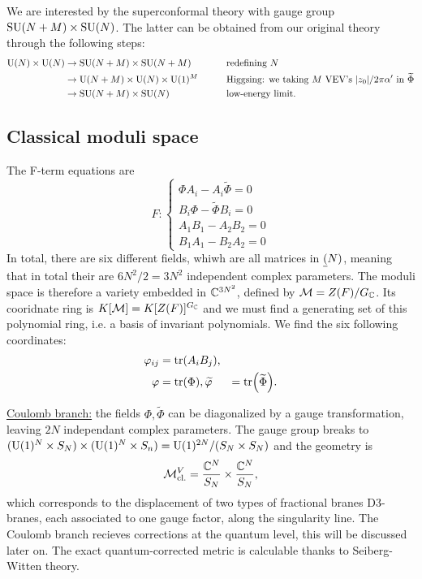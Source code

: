         We are interested by the superconformal theory with gauge group $\text{SU}(N+M)\times\text{SU}(N)$. The latter can be obtained from our original theory through the following steps:
        \begin{alignat}{2}
            \text{U}(N)\times\text{U}(N)&\to \text{SU}(N+M)\times\text{SU}(N+M)\qquad&&\text{redefining $N$}\\
            &\to \text{U}(N+M)\times\text{U}(N)\times\text{U}(1)^M\qquad&&\text{Higgsing: we taking $M$ VEV's $\abs{z_0}/2\pi\alpha'$ in $\widetilde{\Phi}$}\\
            &\to \text{SU}(N+M)\times\text{SU}(N)\qquad&&\text{low-energy limit}.\label{eq:theorymanip}
        \end{alignat}


    \subsection{Classical moduli space}

        The F-term equations are
        \begin{equation}
            F:
            \begin{cases}
                \Phi A_i-A_i\tilde{\Phi} = 0\\
                B_i\Phi-\tilde{\Phi}B_i = 0\\
                A_1B_1-A_2B_2 = 0\\
                B_1A_1-B_2A_2 = 0
            \end{cases}
        \end{equation}
        In total, there are six different fields, whiwh are all matrices in $\underline{(}N)$, meaning that in total their are $6N^2/2=3N^2$ independent complex parameters. The moduli space is therefore a variety embedded in $\mathbb{C}^{3N^2}$, defined by $\mathcal{M}=Z(F)/G_{\mathbb{C}}$. Its cooridnate ring is $K[\mathcal{M}]=K[Z(F)]^{G_{\mathbb{C}}}$ and we must find a generating set of this polynomial ring, i.e. a basis of invariant polynomials. We find the six following coordinates:
        \begin{align}
            \varphi_{ij} &= \tr (A_i B_j),\\
            \varphi &= \tr(\Phi),
            \widetilde{\varphi} &= \tr(\widetilde{\Phi}).
        \end{align}

        \underline{Coulomb branch:} the fields $\Phi,\tilde{\Phi}$ can be diagonalized by a gauge transformation, leaving $2N$ independant complex parameters. The gauge group breaks to $(\text{U}(1)^{N}\times S_N)\times(\text{U}(1)^{N}\times S_n)=\text{U}(1)^{2N}/(S_N\times S_N)$ and the geometry is
        \begin{equation}
            \mathcal{M}^V_{\text{cl.}} = \frac{\mathbb{C}^N}{S_N}\times\frac{\mathbb{C}^N}{S_N},
        \end{equation}
        which corresponds to the displacement of two types of fractional branes D$3$-branes, each associated to one gauge factor, along the singularity line. The Coulomb branch recieves corrections at the quantum level, this will be discussed later on. The exact quantum-corrected metric is calculable thanks to Seiberg-Witten theory\cite{Witten_1997}.


